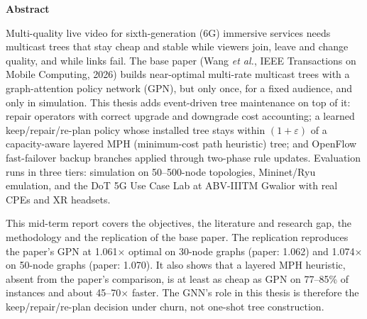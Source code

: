 \documentclass[12pt,phd,times]{pkmthesis}
\begin{document}
\setcounter{page}{1}   %
\doublespacing                              %
\thispagestyle{empty}

\thispagestyle{empty}

\clearpage
\thispagestyle{empty}


\thispagestyle{empty}

\thispagestyle{empty}
\clearpage

\thispagestyle{empty}
{\renewcommand{\baselinestretch}{1.5}
{%
\begin{center}
	{\bf{Abstract}}
\end{center}
{\em{\noindent Multi-quality live video for sixth-generation (6G) immersive services needs multicast trees that stay cheap and stable while viewers join, leave and change quality, and while links fail. The base paper (Wang \emph{et al.}, IEEE Transactions on Mobile Computing, 2026) builds near-optimal multi-rate multicast trees with a graph-attention policy network (GPN), but only once, for a fixed audience, and only in simulation. This thesis adds event-driven tree maintenance on top of it: repair operators with correct upgrade and downgrade cost accounting; a learned keep/repair/re-plan policy whose installed tree stays within $(1+\varepsilon)$ of a capacity-aware layered MPH (minimum-cost path heuristic) tree; and OpenFlow fast-failover backup branches applied through two-phase rule updates. Evaluation runs in three tiers: simulation on 50--500-node topologies, Mininet/Ryu emulation, and the DoT 5G Use Case Lab at ABV-IIITM Gwalior with real CPEs and XR headsets.

This mid-term report covers the objectives, the literature and research gap, the methodology and the replication of the base paper. The replication reproduces the paper's GPN at 1.061$\times$ optimal on 30-node graphs (paper: 1.062) and 1.074$\times$ on 50-node graphs (paper: 1.070). It also shows that a layered MPH heuristic, absent from the paper's comparison, is at least as cheap as GPN on 77--85\% of instances and about 45--70$\times$ faster. The GNN's role in this thesis is therefore the keep/repair/re-plan decision under churn, not one-shot tree construction.
\\

}}}}
\end{document}

